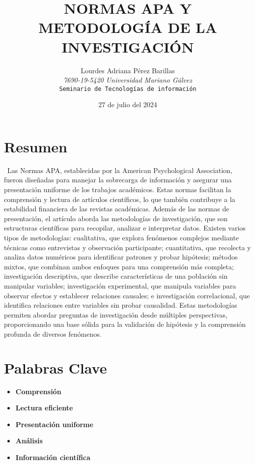 \documentclass[12pt]{article}
\title{\textbf{NORMAS APA Y METODOLOGÍA DE LA INVESTIGACIÓN} \\ }
\author{
    Lourdes Adriana Pérez Barillas \\
    \textit{7690-19-5420 Universidad Mariano Gálvez} \\
    \texttt{Seminario de Tecnologías de información}
}
\date{27 de julio del 2024}
\begin{document}
\maketitle

\section{Resumen}
    \ Las Normas APA, establecidas por la American Psychological Association, fueron diseñadas para manejar la sobrecarga de información y asegurar una presentación uniforme de los trabajos académicos. Estas normas facilitan la comprensión y lectura de artículos científicos, lo que también contribuye a la estabilidad financiera de las revistas académicas. Además de las normas de presentación, el artículo aborda las metodologías de investigación, que son estructuras científicas para recopilar, analizar e interpretar datos. Existen varios tipos de metodologías: cualitativa, que explora fenómenos complejos mediante técnicas como entrevistas y observación participante; cuantitativa, que recolecta y analiza datos numéricos para identificar patrones y probar hipótesis; métodos mixtos, que combinan ambos enfoques para una comprensión más completa; investigación descriptiva, que describe características de una población sin manipular variables; investigación experimental, que manipula variables para observar efectos y establecer relaciones causales; e investigación correlacional, que identifica relaciones entre variables sin probar causalidad. Estas metodologías permiten abordar preguntas de investigación desde múltiples perspectivas, proporcionando una base sólida para la validación de hipótesis y la comprensión profunda de diversos fenómenos. \\



\section{
    Palabras Clave
}
\begin{itemize}
    \item \textbf{Comprensión}
    \item \textbf{Lectura eficiente}
    \item \textbf{Presentación uniforme}
    \item \textbf{Análisis}
    \item \textbf{Información científica}
\end{itemize}
\end{document}
